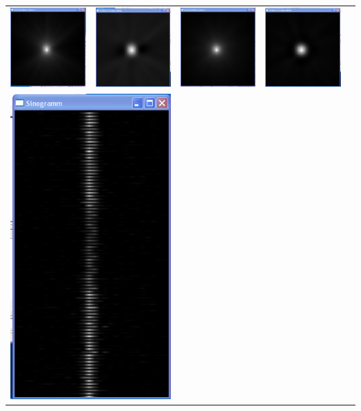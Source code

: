 \begin{longtable}{p{3cm}p{3cm}p{3cm}p{3cm}c}
                  \includegraphics[width=.2\textwidth, height=0.125\textheight]{pic/Einzelfenster_Bilder/inhomogene_Messung/inhomo5einf_rueckprj.png}
                  & 
                  \includegraphics[width=.2\textwidth, height=0.125\textheight]{pic/Einzelfenster_Bilder/inhomogene_Messung/inhomo5gef_prj.png}
                  &
                  \includegraphics[width=.2\textwidth, height=0.125\textheight]{pic/Einzelfenster_Bilder/isotrope_Messung/iso6einf_prj.png}
                  & 
                  \includegraphics[width=.2\textwidth, height=0.125\textheight]{pic/Einzelfenster_Bilder/isotrope_Messung/iso6gef_prj.png}\\
                  \multicolumn{2}{c}{\includegraphics[width=.2\textwidth, height=0.25\textheight]{pic/Einzelfenster_Bilder/inhomogene_Messung/inhomo5sino.png}}

\end{longtable}
